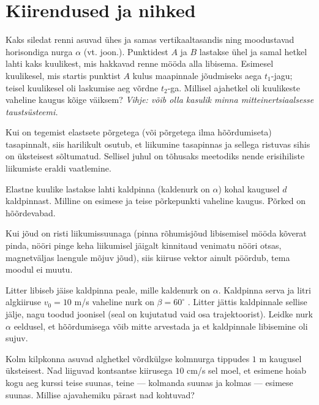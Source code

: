\documentclass[a4paper,11pt,twocolumn]{article}
\begin{document}
\section{Kiirendused ja nihked}
\begin{question}[kin2][6.5cm]
	Kaks siledat renni asuvad ühes ja samas vertikaaltasandis ning moodustavad horisondiga nurga $ \alpha $ (vt. joon.). Punktidest $ A $ ja $ B $ lastakse ühel ja samal hetkel lahti kaks kuulikest, mis hakkavad renne mööda alla libisema. Esimesel kuulikesel, mis startis punktist $ A $ kulus maapinnale jõudmiseks aega $ t_1 $-jagu; teisel kuulikesel oli laskumise aeg võrdne $ t_2 $-ga. Millisel ajahetkel oli kuulikeste vaheline kaugus kõige väiksem? \textit{Vihje: võib olla kasulik minna mitteinertsiaalsesse taustsüsteemi.}
\end{question}

Kui on tegemist elastsete põrgetega (või põrgetega ilma hõõrdumiseta) tasapinnalt, siis harilikult osutub, et liikumine tasapinnas ja sellega ristuvas sihis on üksteisest sõltumatud. Sellisel juhul on tõhusaks meetodiks nende erisihiliste liikumiste eraldi vaatlemine.
\begin{question}
	Elastne kuulike lastakse lahti kaldpinna (kaldenurk on $ \alpha $) kohal kaugusel $ d $ kaldpinnast. Milline on esimese ja teise põrkepunkti vaheline kaugus. Põrked on hõõrdevabad.
\end{question}

Kui jõud on risti liikumissuunaga (pinna rõhumisjõud libisemisel mööda kõverat pinda, nööri pinge keha liikumisel jäigalt kinnitaud venimatu nööri otsas, magnetväljas laengule mõjuv jõud), siis kiiruse vektor ainult pöördub, tema moodul ei muutu.
\begin{question}[NSVL ol. 1981, 8. kl][kin3][6.8cm]
	Litter libiseb jäise kaldpinna peale, mille kaldenurk on $ \alpha $. Kaldpinna serva ja litri algkiiruse $ v_0=10 $ m/s vaheline nurk on $ \beta = 60^\circ $
	. Litter jättis kaldpinnale sellise jälje, nagu toodud joonisel (seal on kujutatud vaid osa trajektoorist). Leidke nurk $ \alpha $ eeldusel, et hõõrdumisega võib mitte arvestada ja et kaldpinnale
	libisemine oli sujuv.
\end{question}
\begin{question}
	Kolm kilpkonna asuvad alghetkel võrdkülgse kolmnurga tippudes \( 1 \) m kaugusel üksteisest. Nad liiguvad kontsantse kiirusega $ 10 $ cm/s sel moel, et esimene hoiab kogu aeg kurssi teise suunas, teine — kolmanda suunas ja kolmas — esimese suunas. Millise ajavahemiku pärast nad kohtuvad?
\end{question}
\end{document}
